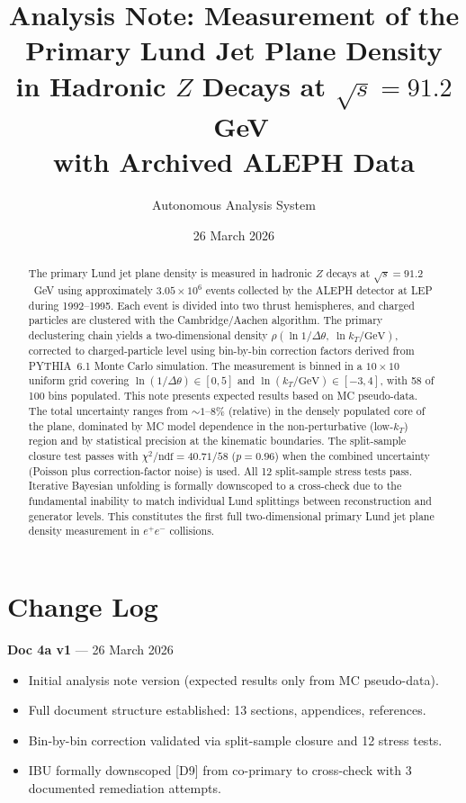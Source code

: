 \documentclass[11pt,a4paper]{article}
\title{Analysis Note: Measurement of the Primary Lund Jet Plane Density\\
in Hadronic $Z$ Decays at $\sqrt{s} = 91.2$~GeV\\
with Archived ALEPH Data}
\author{Autonomous Analysis System}
\date{26 March 2026}
\begin{document}
\maketitle

\begin{abstract}
The primary Lund jet plane density is measured in hadronic $Z$ decays
at $\sqrt{s} = 91.2$~GeV using approximately $3.05 \times 10^6$
events collected by the ALEPH detector at LEP during 1992--1995.
Each event is divided into two thrust hemispheres, and charged
particles are clustered with the Cambridge/Aachen algorithm.
The primary declustering chain yields a two-dimensional density
$\rho(\ln 1/\Delta\theta,\;\ln k_T/\text{GeV})$, corrected to
charged-particle level using bin-by-bin correction factors derived
from PYTHIA~6.1 Monte Carlo simulation.  The measurement is binned in a
$10 \times 10$ uniform grid covering $\ln(1/\Delta\theta) \in [0, 5]$
and $\ln(k_T/\text{GeV}) \in [-3, 4]$, with 58 of 100 bins
populated.  This note presents expected results based on MC
pseudo-data.  The total uncertainty ranges from $\sim\!1$--$8\%$
(relative) in the densely populated core of the plane, dominated
by MC model dependence in the non-perturbative (low-$k_T$) region
and by statistical precision at the kinematic boundaries.  The split-sample
closure test passes with $\chi^2/\text{ndf} = 40.71/58$ ($p = 0.96$)
when the combined uncertainty (Poisson plus correction-factor noise) is
used.  All 12 split-sample stress tests pass.  Iterative Bayesian
unfolding is formally downscoped to a cross-check due to the
fundamental inability to match individual Lund splittings between
reconstruction and generator levels.  This constitutes the first full
two-dimensional primary Lund jet plane density measurement in
$e^+e^-$ collisions.
\end{abstract}

\tableofcontents
\clearpage

\section*{Change Log}

\textbf{Doc 4a v1} --- 26 March 2026
\begin{itemize}
\item Initial analysis note version (expected results only from MC pseudo-data).
\item Full document structure established: 13 sections, appendices, references.
\item Bin-by-bin correction validated via split-sample closure and 12 stress tests.
\item IBU formally downscoped [D9] from co-primary to cross-check with 3 documented remediation attempts.
\end{itemize}
\end{document}
